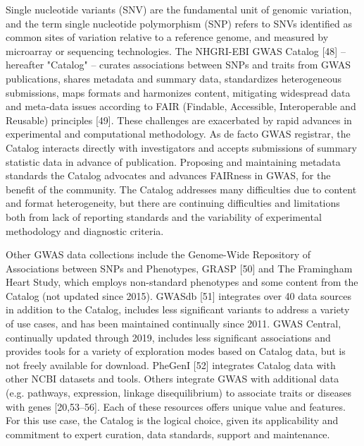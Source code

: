 Single nucleotide variants (SNV) are the fundamental unit of genomic variation, and the term single nucleotide polymorphism (SNP) refers to SNVs identified as common sites of variation relative to a reference genome, and measured by microarray or sequencing technologies. The NHGRI-EBI GWAS Catalog [48] -- hereafter "Catalog" -- curates associations between SNPs and traits from GWAS publications, shares metadata and summary data, standardizes heterogeneous submissions, maps formats and harmonizes content, mitigating widespread data and meta-data issues according to FAIR (Findable, Accessible, Interoperable and Reusable) principles [49]. These challenges are exacerbated by rapid advances in experimental and computational methodology. As de facto GWAS registrar, the Catalog interacts directly with investigators and accepts submissions of summary statistic data in advance of publication. Proposing and maintaining metadata standards the Catalog advocates and advances FAIRness in GWAS, for the benefit of the community. The Catalog addresses many difficulties due to content and format heterogeneity, but there are continuing difficulties and limitations both from lack of reporting standards and the variability of experimental methodology and diagnostic criteria.

Other GWAS data collections include the Genome-Wide Repository of Associations between SNPs and Phenotypes, GRASP [50] and The Framingham Heart Study, which employs non-standard phenotypes and some content from the Catalog (not updated since 2015). GWASdb [51] integrates over 40 data sources in addition to the Catalog, includes less significant variants to address a variety of use cases, and has been maintained continually since 2011. GWAS Central, continually updated through 2019, includes less significant associations and provides tools for a variety of exploration modes based on Catalog data, but is not freely available for download. PheGenI [52] integrates Catalog data with other NCBI datasets and tools. Others integrate GWAS with additional data (e.g. pathways, expression, linkage disequilibrium) to associate traits or diseases with genes [20,53–56]. Each of these resources offers unique value and features. For this use case, the Catalog is the logical choice, given its applicability and commitment to expert curation, data standards, support and maintenance.

